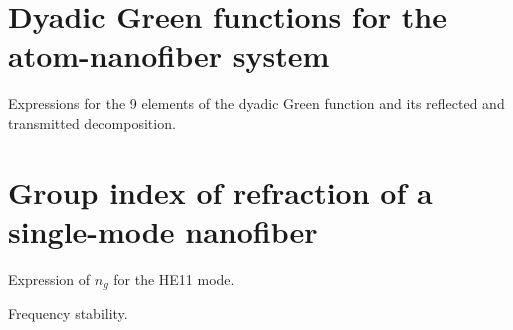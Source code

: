 \documentclass[preprint,pra,onecolumn]{revtex4-1} %
\begin{document}
\appendix
\section{Dyadic Green functions for the atom-nanofiber system}
Expressions for the 9 elements of the dyadic Green function and its reflected and transmitted decomposition.

\section{Group index of refraction of a single-mode nanofiber}
Expression of $ n_g $ for the HE11 mode.

Frequency stability.


%
%

\ifwindows
	
\else
	
\fi
\end{document}
